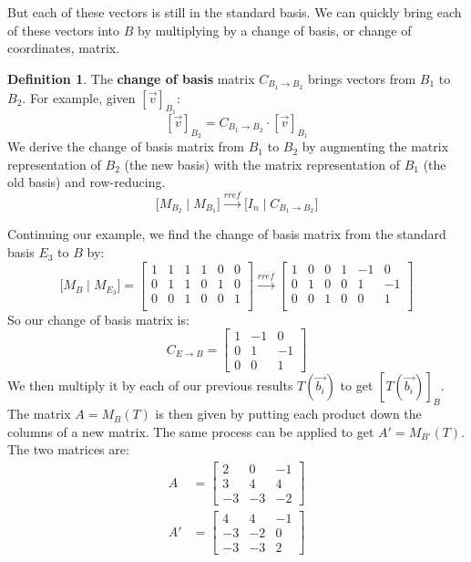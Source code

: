 \documentclass[11pt]{amsart}
\theoremstyle{definition}
\newtheorem{definition}[theorem]{Definition}
\begin{document}
But each of these vectors is still in the standard basis. We can quickly bring each of these vectors into $B$ by multiplying by a change of basis,
or change of coordinates, matrix.
\newpage
\begin{definition}
	The \textbf{change of basis} matrix $C_{B_1 \rightarrow B_2}$ brings vectors from $B_1$ to $B_2$. For example, given $[ \vec{v} ]_{B_1}$:
	\[
		[ \vec{v} ]_{B_2} = C_{B_1 \rightarrow B_2} \cdot [ \vec{v} ]_{B_1}
	\]
	We derive the change of basis matrix from $B_1$ to $B_2$ by augmenting the matrix representation of $B_2$ (the new basis) with the
	matrix representation of $B_1$ (the old basis) and row-reducing.
	\[
		\big[ M_{B_2} \mid M_{B_1} \big] \xrightarrow{rref} \big[ I_n \mid C_{B_1 \rightarrow B_2} \big]
	\]
\end{definition}
Continuing our example, we find the change of basis matrix from the standard basis $E_3$ to $B$ by:
\[
	\big[ M_{B} \mid M_{E_3} \big] = 
		\left[\begin{array}{ccc|ccc}
		1 & 1 & 1 & 1 & 0 & 0 \\
		0 & 1 & 1 & 0 & 1 & 0 \\
		0 & 0 & 1 & 0 & 0 & 1 \\
		\end{array}\right] \xrightarrow{rref}
		\left[\begin{array}{ccc|ccc}
		1 & 0 & 0 & 1 & -1 & 0 \\
		0 & 1 & 0 & 0 & 1 & -1 \\
		0 & 0 & 1 & 0 & 0 & 1 \\
		\end{array}\right]
\]
So our change of basis matrix is:
\[
	C_{E \rightarrow B} = \begin{bmatrix} 1 & -1 & 0 \\ 0 & 1 & -1 \\ 0 & 0 & 1 \end{bmatrix}
\]
We then multiply it by each of our previous results $T(\vec{b_i})$ to get $[ T(\vec{b_i}) ]_{B}$. The matrix $A = M_B(T)$ is then given by putting
each product down the columns of a new matrix. The same process can be applied to get $A' = M_{B'}(T)$. The two matrices are:
\begin{align*}
	A &= \begin{bmatrix} 2 & 0 & -1 \\ 3 & 4 & 4 \\ -3 & -3 & -2 \end{bmatrix} \\
	A' &= \begin{bmatrix} 4 & 4 & -1 \\ -3 & -2 & 0 \\ -3 & -3 & 2 \end{bmatrix} \\
\end{align*}
\end{document}
